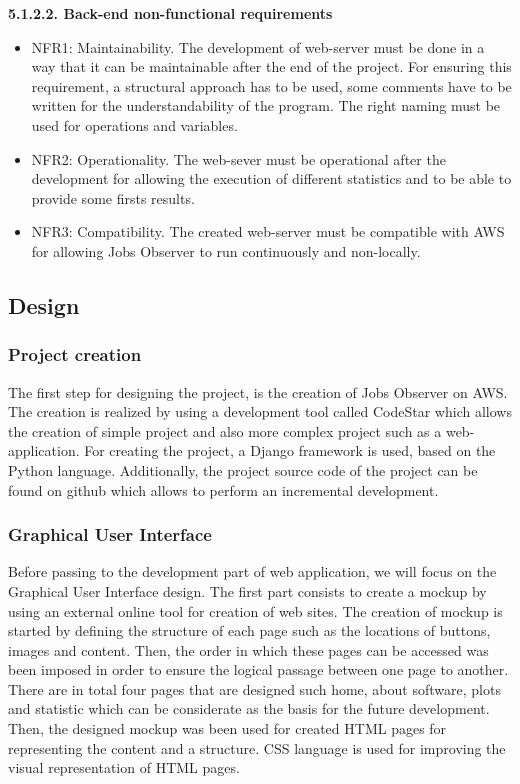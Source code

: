 \documentclass[conference,compsoc]{IEEEtran}
\begin{document}
\noindent
\newline\newline
\textbf{5.1.2.2. Back-end non-functional requirements}
\newline

\begin{itemize}
\item NFR1: Maintainability. The development of web-server must be done in a way that it can be maintainable after the end of the project. For ensuring this requirement, a structural approach has to be used, some comments have to be written for the understandability of the program. The right naming must be used for operations and variables. 
\newline

\item NFR2: Operationality. The web-sever must be operational after the development for allowing the execution of different statistics and to be able to provide some firsts results. 
\newline

\item NFR3: Compatibility. The created web-server must be compatible with AWS for allowing Jobs Observer to run continuously and non-locally. 
\end{itemize}

\subsection{Design}
\subsubsection{Project creation}
The first step for designing the project, is the creation of Jobs Observer on AWS. The creation is realized by using a development tool called CodeStar which allows the creation of simple project and also more complex project such as a web-application. For creating the project, a Django framework is used, based on the Python language. Additionally, the project source code of the project can be found on github which allows to perform an incremental development. 
 
\subsubsection{Graphical User Interface}
Before passing to the development part of web application, we will focus on the Graphical User Interface design. The first part consists to create a mockup by using an external online tool for creation of web sites. The creation of mockup is started by defining the structure of each page such as the locations of buttons, images and content. Then, the order in which these pages can be accessed was been imposed in order to ensure the logical passage between one page to another. There are in total four pages that are designed such home, about software, plots and statistic which can be considerate as the basis for the future development. 
\newline
Then, the designed mockup was been used for created HTML pages for representing the content and a structure. CSS language is used for improving the visual representation of HTML pages. 
\end{document}
